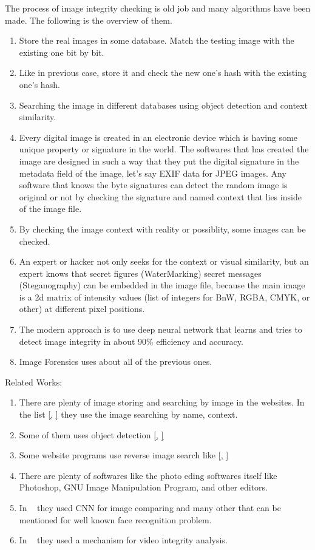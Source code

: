 The process of image integrity checking is old job and many algorithms have been made. The following is the overview of them.
\begin{enumerate}
\item Store the real images in some database. Match the testing image with the existing one bit by bit.
\item Like in previous case, store it and check the new one's hash with the existing one's hash.
\item Searching the image in different databases using object detection and context similarity.
\item Every digital image is created in an electronic device which is having some unique property or signature in the world. The softwares that has created the image are designed in such a way that they put the digital signature in the metadata field of the image, let's say EXIF data for JPEG images. Any software that knows the byte signatures can detect the random image is original or not by checking the signature and named context that lies inside of the image file.
\item By checking the image context with reality or possiblity, some images can be checked.
\item An expert or hacker not only seeks for the context or visual similarity, but an expert knows that secret figures (WaterMarking) secret messages (Steganography) can be embedded in the image file, because the main image is a 2d matrix of intensity values (list of integers for BnW, RGBA, CMYK, or other) at different pixel positions.
\item The modern approach is to use deep neural network that learns and tries to detect image integrity in about 90\% efficiency and accuracy.
\item Image Forensics uses about all of the previous ones.
\end{enumerate}

Related Works:
\begin{enumerate}
\item There are plenty of image storing and searching by image in the websites. In the list [\href{https://images.google.com/}, \href{https://www.yandex.com/images/}] they use the image searching by name, context.
\item Some of them uses object detection [\href{https://images.google.com/}, \href{https://www.imageidentify.com/}]
\item Some website programs use reverse image search like [\href{https://images.google.com/}, \href{https://tineye.com/}]
\item There are plenty of softwares like the photo eding softwares itself like Photoshop, GNU Image Manipulation Program, and other editors.
\item In ~\cite{img_cnn} they used CNN for image comparing and many other that can be mentioned for well known face recognition problem.
\item In ~\cite{adam_fabian} they used a mechanism for video integrity analysis.
\end{enumerate}

